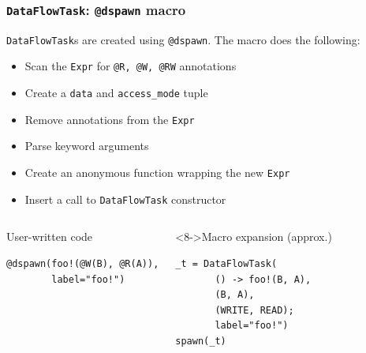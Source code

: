 \documentclass{beamer}
\begin{document}
\begin{frame}[fragile]

\frametitle{\texttt{DataFlowTask}: \texttt{@dspawn} macro}

\texttt{DataFlowTask}s are created using \texttt{@dspawn}. The macro
does the following:

\begin{itemize}
    \item <2->Scan the \texttt{Expr} for \texttt{@R, @W, @RW} annotations
    \item <3->Create a \texttt{data} and \texttt{access_mode}
    tuple
    \item <4->Remove annotations from the \texttt{Expr}
    \item <5->Parse keyword arguments    
    \item <6->Create an anonymous function wrapping the new \texttt{Expr}
    \item <7->Insert a call to \texttt{DataFlowTask} constructor
\end{itemize}

\begin{columns}[T]

\begin{exampleblock}{User-written code}    
\begin{verbatim}
@dspawn(foo!(@W(B), @R(A)),
        label="foo!")
\end{verbatim}
\end{exampleblock}


\begin{exampleblock}<8->{Macro expansion (approx.)}    
\begin{verbatim}
_t = DataFlowTask(
       () -> foo!(B, A),
       (B, A),
       (WRITE, READ);
       label="foo!")
spawn(_t)
\end{verbatim}
\end{exampleblock}

\end{columns}
%

\end{frame} 
\end{document}
